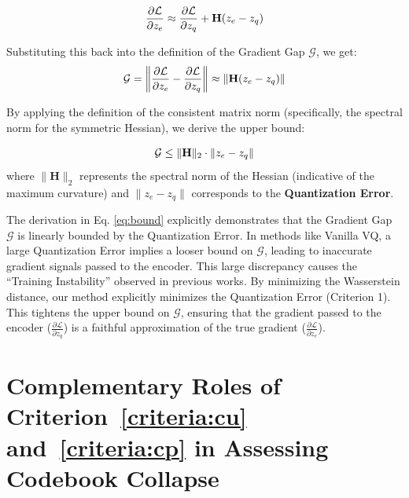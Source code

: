 \begin{equation}
    \frac{\partial \mathcal{L}}{\partial z_e} \approx \frac{\partial \mathcal{L}}{\partial z_q} + \mathbf{H} (z_e - z_q)
\vspace{-3pt}
\end{equation}

Substituting this back into the definition of the Gradient Gap $\mathcal{G}$, we get:
\begin{equation}
    \mathcal{G} = \left\| \frac{\partial \mathcal{L}}{\partial z_e} - \frac{\partial \mathcal{L}}{\partial z_q} \right\| \approx \| \mathbf{H} (z_e - z_q) \|
\vspace{-3pt}
\end{equation}

By applying the definition of the consistent matrix norm (specifically, the spectral norm for the symmetric Hessian), we derive the upper bound:

\begin{equation}
    \mathcal{G} \le \| \mathbf{H} \|_2 \cdot \| z_e - z_q \|
    \label{eq:bound}
\vspace{-3pt}
\end{equation}
where $\| \mathbf{H} \|_2$ represents the spectral norm of the Hessian (indicative of the maximum curvature) and $\| z_e - z_q \|$ corresponds to the \textbf{Quantization Error}.


The derivation in Eq. \ref{eq:bound} explicitly demonstrates that the Gradient Gap $\mathcal{G}$ is linearly bounded by the Quantization Error. In methods like Vanilla VQ, a large Quantization Error implies a looser bound on $\mathcal{G}$, leading to inaccurate gradient signals passed to the encoder. This large discrepancy causes the ``Training Instability'' observed in previous works. By minimizing the Wasserstein distance, our method explicitly minimizes the Quantization Error (Criterion 1). This tightens the upper bound on $\mathcal{G}$, ensuring that the gradient passed to the encoder ($\frac{\partial \mathcal{L}}{\partial z_q}$) is a faithful approximation of the true gradient ($\frac{\partial \mathcal{L}}{\partial z_e}$).

\section{Complementary Roles of Criterion~\ref{criteria:cu} and~\ref{criteria:cp} in Assessing Codebook Collapse} 
\label{appendix:explanation on criterions}

